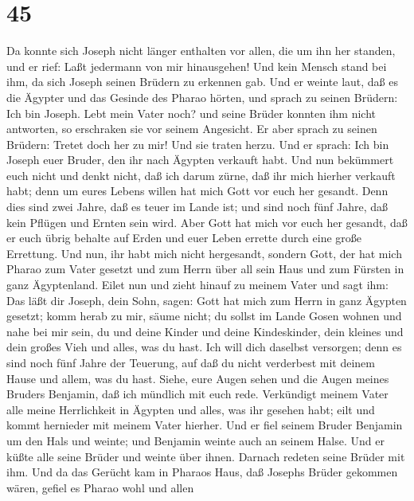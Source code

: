 \hypertarget{section-44}{%
\section{45}\label{section-44}}

 Da konnte sich Joseph nicht länger enthalten vor allen, die
um ihn her standen, und er rief: Laßt jedermann von mir hinausgehen! Und
kein Mensch stand bei ihm, da sich Joseph seinen Brüdern zu erkennen
gab.  Und er weinte laut, daß es die Ägypter und das Gesinde
des Pharao hörten,  und sprach zu seinen Brüdern: Ich bin
Joseph. Lebt mein Vater noch? und seine Brüder konnten ihm nicht
antworten, so erschraken sie vor seinem Angesicht.  Er aber
sprach zu seinen Brüdern: Tretet doch her zu mir! Und sie traten herzu.
Und er sprach: Ich bin Joseph euer Bruder, den ihr nach Ägypten verkauft
habt.  Und nun bekümmert euch nicht und denkt nicht, daß ich
darum zürne, daß ihr mich hierher verkauft habt; denn um eures Lebens
willen hat mich Gott vor euch her gesandt.  Denn dies sind
zwei Jahre, daß es teuer im Lande ist; und sind noch fünf Jahre, daß
kein Pflügen und Ernten sein wird.  Aber Gott hat mich vor
euch her gesandt, daß er euch übrig behalte auf Erden und euer Leben
errette durch eine große Errettung.  Und nun, ihr habt mich
nicht hergesandt, sondern Gott, der hat mich Pharao zum Vater gesetzt
und zum Herrn über all sein Haus und zum Fürsten in ganz Ägyptenland.
 Eilet nun und zieht hinauf zu meinem Vater und sagt ihm:
Das läßt dir Joseph, dein Sohn, sagen: Gott hat mich zum Herrn in ganz
Ägypten gesetzt; komm herab zu mir, säume nicht;  du sollst
im Lande Gosen wohnen und nahe bei mir sein, du und deine Kinder und
deine Kindeskinder, dein kleines und dein großes Vieh und alles, was du
hast.  Ich will dich daselbst versorgen; denn es sind noch
fünf Jahre der Teuerung, auf daß du nicht verderbest mit deinem Hause
und allem, was du hast.  Siehe, eure Augen sehen und die
Augen meines Bruders Benjamin, daß ich mündlich mit euch rede.
 Verkündigt meinem Vater alle meine Herrlichkeit in Ägypten
und alles, was ihr gesehen habt; eilt und kommt hernieder mit meinem
Vater hierher.  Und er fiel seinem Bruder Benjamin um den
Hals und weinte; und Benjamin weinte auch an seinem Halse. 
Und er küßte alle seine Brüder und weinte über ihnen. Darnach redeten
seine Brüder mit ihm.  Und da das Gerücht kam in Pharaos
Haus, daß Josephs Brüder gekommen wären, gefiel es Pharao wohl und allen
